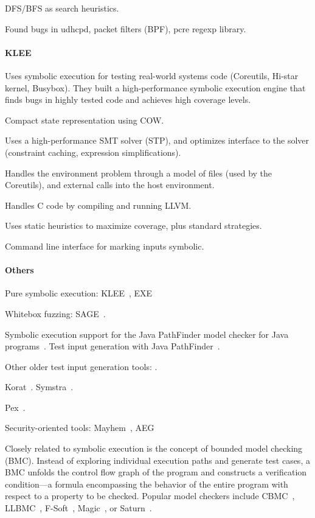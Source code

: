 DFS/BFS as search heuristics.

Found bugs in udhcpd, packet filters (BPF), pcre regexp library.


\paragraph{KLEE}

Uses symbolic execution for testing real-world systems code (Coreutils, Hi-star kernel, Busybox).  They built a high-performance symbolic execution engine that finds bugs in highly tested code and achieves high coverage levels.

Compact state representation using COW.

Uses a high-performance SMT solver (STP), and optimizes interface to the solver (constraint caching, expression simplifications).

Handles the environment problem through a model of files (used by the Coreutils), and external calls into the host environment.

Handles C code by compiling and running LLVM.

Uses static heuristics to maximize coverage, plus standard strategies.

Command line interface for marking inputs symbolic.

\paragraph{Others}

Pure symbolic execution: KLEE~\cite{klee}, EXE~\cite{exe}

Whitebox fuzzing: SAGE~\cite{sage2012,godefroid:fuzz}.

Symbolic execution support for the Java PathFinder model checker for Java programs~\cite{jpf-symbex}.  Test input generation with Java PathFinder~\cite{jpf-testgen}.

Other older test input generation tools: \cite{genptrinputs}.

Korat~\cite{boyapati:korat}. Symstra~\cite{xie:symstra}.

Pex~\cite{tillmann-pex}.

Security-oriented tools: Mayhem~\cite{mayhem}, AEG~\cite{aeg}

Closely related to symbolic execution is the concept of bounded model checking (BMC).  Instead of exploring individual execution paths and generate test cases, a BMC unfolds the control flow graph of the program and constructs a verification condition---a formula encompassing the behavior of the entire program with respect to a property to be checked.  Popular model checkers include CBMC~\cite{cbmc}, LLBMC~\cite{llbmc2012}, F-Soft~\cite{f-soft}, Magic~\cite{magic}, or Saturn~\cite{saturn}.

